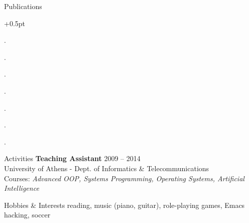 \documentclass{resume}
\begin{document}
\begin{rSection}{Publications}
  \begin{rSubsection}{}{}{}{}
    \itemsep +0.5pt %
  \item {}.
  \item {}.
  \item {}.
  \item {}.
  \item {}.
  \item {}.
  \item {}.
  \end{rSubsection}
\end{rSection}



\begin{rSection}{Activities}
  {\bf Teaching Assistant} \hfill {2009 -- 2014} \\
  University of Athens - Dept. of Informatics \& Telecommunications \\
  Courses: \emph{Advanced OOP, Systems Programming, Operating Systems,
    Artificial Intelligence} \\
\end{rSection}


\begin{rSection}{Hobbies \& Interests}
  reading, music (piano, guitar), role-playing games, Emacs hacking, soccer \\
\end{rSection}


\end{document}
